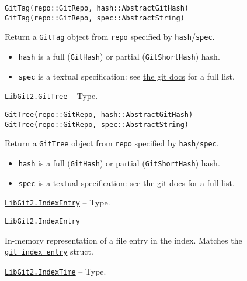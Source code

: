 \begin{adjustwidth}{2em}{0pt}


\begin{verbatim}
GitTag(repo::GitRepo, hash::AbstractGitHash)
GitTag(repo::GitRepo, spec::AbstractString)
\end{verbatim}

Return a \texttt{GitTag} object from \texttt{repo} specified by \texttt{hash}/\texttt{spec}.

\begin{itemize}
\item \texttt{hash} is a full (\texttt{GitHash}) or partial (\texttt{GitShortHash}) hash.


\item \texttt{spec} is a textual specification: see \href{https://git-scm.com/docs/git-rev-parse.html\#\_specifying\_revisions}{the git docs} for a full list.

\end{itemize}


\end{adjustwidth}
\hypertarget{6242150303858692069}{} 
\hyperlink{6242150303858692069}{\texttt{LibGit2.GitTree}}  -- {Type.}

\begin{adjustwidth}{2em}{0pt}


\begin{verbatim}
GitTree(repo::GitRepo, hash::AbstractGitHash)
GitTree(repo::GitRepo, spec::AbstractString)
\end{verbatim}

Return a \texttt{GitTree} object from \texttt{repo} specified by \texttt{hash}/\texttt{spec}.

\begin{itemize}
\item \texttt{hash} is a full (\texttt{GitHash}) or partial (\texttt{GitShortHash}) hash.


\item \texttt{spec} is a textual specification: see \href{https://git-scm.com/docs/git-rev-parse.html\#\_specifying\_revisions}{the git docs} for a full list.

\end{itemize}


\end{adjustwidth}
\hypertarget{2169451189682045075}{} 
\hyperlink{2169451189682045075}{\texttt{LibGit2.IndexEntry}}  -- {Type.}

\begin{adjustwidth}{2em}{0pt}


\begin{verbatim}
LibGit2.IndexEntry
\end{verbatim}

In-memory representation of a file entry in the index. Matches the \href{https://libgit2.org/libgit2/\#HEAD/type/git\_index\_entry}{\texttt{git\_index\_entry}} struct.



\end{adjustwidth}
\hypertarget{13894240843968539685}{} 
\hyperlink{13894240843968539685}{\texttt{LibGit2.IndexTime}}  -- {Type.}

